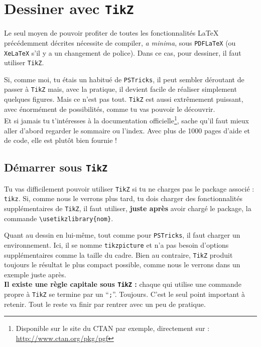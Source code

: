 \chapter{Dessiner avec \texttt{TikZ}}

\label{chap_dessin_tikz}Le seul moyen de pouvoir profiter de toutes les fonctionnalités \LaTeX{} précédemment décrites nécessite de compiler, \textit{a minima}, sous \verb?PDFLaTeX? (ou \verb?XeLaTeX? s'il y a un changement de police). Dans ce cas, pour dessiner, il faut utiliser \texttt{TikZ}.

Si, comme moi, tu étais un habitué de \texttt{PSTricks}, il peut sembler déroutant de passer à \texttt{TikZ} mais, avec la pratique, il devient facile de réaliser simplement quelques figures. Mais ce n'est pas tout. \texttt{TikZ} est aussi extrêmement puissant, avec énormément de possibilités, comme tu vas pouvoir le découvrir. \\

Et si jamais tu t'intéresses à la documentation officielle\footnote{Disponible sur le site du CTAN par exemple, directement sur : \url{http://www.ctan.org/pkg/pgf}}, sache qu'il faut mieux aller d'abord regarder le sommaire ou l'index. Avec plus de 1000 pages d'aide et de code, elle est plutôt bien fournie !

\section{Démarrer sous \texttt{TikZ}}

Tu vas difficilement pouvoir utiliser \texttt{TikZ} si tu ne charges pas le package associé : \verb?tikz?. Si, comme nous le verrons plus tard, tu dois charger des fonctionnalités supplémentaires de \texttt{TikZ}, il faut utiliser, \textbf{juste après} avoir chargé le package, la commande \verb?\usetikzlibrary{nom}?.

Quant au dessin en lui-même, tout comme pour \texttt{PSTricks}, il faut charger un environnement. Ici, il se nomme \verb?tikzpicture? et n'a pas besoin d'options supplémentaires comme la taille du cadre. Bien au contraire, \texttt{TikZ} produit toujours le résultat le plus compact possible, comme nous le verrons dans un exemple juste après. \\

\textcolor{BrickRed}{\textbf{Il existe une règle capitale sous \texttt{TikZ} :}} chaque qui utilise une commande propre à \texttt{TikZ} se termine par un ``\verb?;?''. Toujours. C'est le seul point important à retenir. Tout le reste va finir par rentrer avec un peu de pratique.


